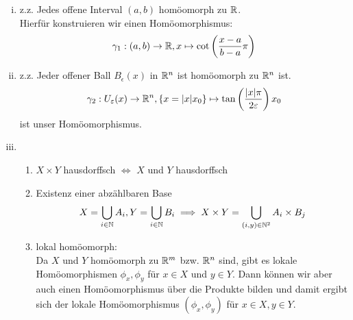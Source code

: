 \documentclass{scrartcl}
\begin{document}
\setcounter{section}{7}
\setcounter{aufgabe}{1}
\begin{aufgabe}
\begin{enumerate}[(i)]
\item z.z. Jedes offene Interval $ (a,b) $ homöomorph zu $ \mathbb{R} $.\\
Hierfür konstruieren wir einen Homöomorphismus:
\[
\gamma_1: (a,b) \to \mathbb{R}, x \mapsto \cot\left(\frac{x-a}{b-a}\pi\right)
\]
\item z.z. Jeder offener Ball $ B_\epsilon (x) $ in $ \mathbb{R}^n $ ist homöomorph zu $ \mathbb{R}^n $ ist.\\
\[
\gamma_2: U_\varepsilon (x) \to \mathbb{R}^n, \{x=|x|x_0\} \mapsto \tan\left(\frac{|x|\pi}{2\varepsilon}\right)x_0
\]
ist unser Homöomorphismus.
\item
\begin{enumerate}
\item $ X \times Y $ hausdorffsch $ \iff $ $ X $ und $ Y $ hausdorffsch
\item Existenz einer abzählbaren Base\\
\[
X=\bigcup_{i\in \mathbb{N}} A_i, Y=\bigcup_{i\in \mathbb{N}} B_i \implies X\times Y = \bigcup_{(i,y)\in \mathbb{N}^2} A_i \times B_j
\]
\item lokal homöomorph:\\
Da $ X $ und $ Y $ homöomorph zu $ \mathbb{R}^m $ bzw. $ \mathbb{R}^n $  sind, gibt es lokale Homöomorphismen $ \phi_x, \phi_y $ für $ x\in X $ und $ y\in Y $. Dann können wir aber auch einen Homöomorphismus über die Produkte bilden und damit ergibt sich der lokale Homöomorphismus $ (\phi_x,\phi_y) $ für $ x\in X, y\in Y $.  
\end{enumerate}
\end{enumerate}
\end{aufgabe}
\end{document}
